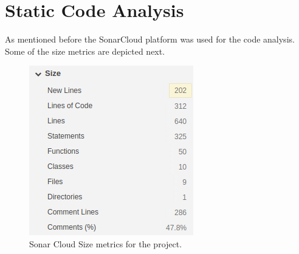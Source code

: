 \documentclass[margin,line,a4paper,authoryear,12pt]{report}
\begin{document}
\section{Static Code Analysis}

As mentioned before the SonarCloud platform was used for the code analysis. Some of the size metrics are depicted next.

\begin{figure}[h!]
    \centering
    \includegraphics[width=0.4\linewidth]{Size_measures.png}
    \caption{Sonar Cloud Size metrics for the project.}
    \label{fig:smells}
\end{figure}

\end{document}
